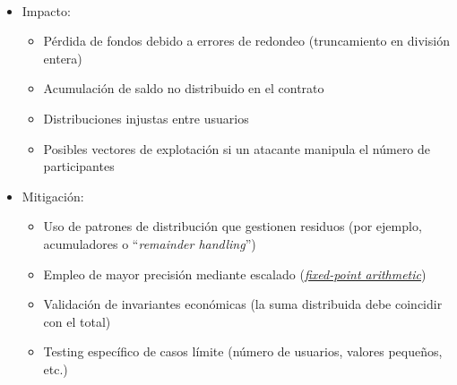 \begin{Shaded}
\begin{Highlighting}[]
 \NormalTok{() }\NormalTok{ \{}

\OperatorTok{=}\OperatorTok{/}\OperatorTok{;}

    \OperatorTok{=} \OperatorTok{;}\OperatorTok{\textless{}}\OperatorTok{;}\OperatorTok{++}\NormalTok{) \{}

\OperatorTok{+=}\OperatorTok{;}

\NormalTok{    \}}

\NormalTok{\}}
\end{Highlighting}
\end{Shaded}

\begin{itemize}
\tightlist
\item
  Impacto:

  \begin{itemize}
  \tightlist
  \item
    Pérdida de fondos debido a errores de redondeo (truncamiento en
    división entera)
  \item
    Acumulación de saldo no distribuido en el contrato
  \item
    Distribuciones injustas entre usuarios
  \item
    Posibles vectores de explotación si un atacante manipula el número
    de participantes
  \end{itemize}
\item
  Mitigación:

  \begin{itemize}
  \tightlist
  \item
    Uso de patrones de distribución que gestionen residuos (por ejemplo,
    acumuladores o ``\emph{remainder handling}'')
  \item
    Empleo de mayor precisión mediante escalado
    (\href{https://rareskills.io/post/solidity-fixed-point}{\emph{fixed-point
    arithmetic}})
  \item
    Validación de invariantes económicas (la suma distribuida debe
    coincidir con el total)
  \item
    Testing específico de casos límite (número de usuarios, valores
    pequeños, etc.)
  \end{itemize}
\end{itemize}

